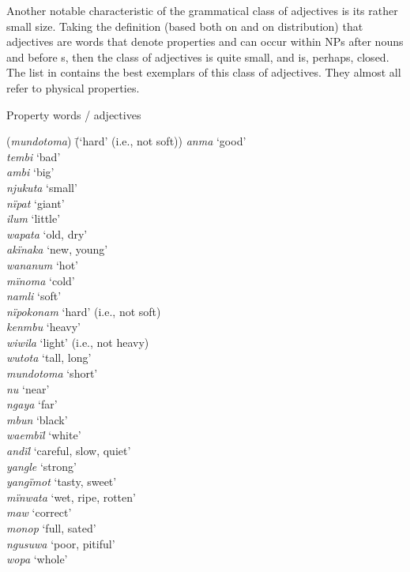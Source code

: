 
Another notable characteristic of the grammatical class of adjectives is its rather small size. Taking the definition (based both on  and on  distribution) that adjectives are words that denote properties and can occur within NPs after nouns and before s, then the class of adjectives is quite small, and is, perhaps, closed. The list in  contains the best exemplars of this class of adjectives. They almost all refer to physical properties.

\ea%
    \label{ex:adj:22}
          Property words / adjectives
\begin{tabbing}
{(\textit{mundotoma}}) \= {(‘hard’ (i.e., not soft))}\kill
\textit{anma}   \>   ‘good’\\
 \textit{tembi}  \>    ‘bad’\\
 \textit{ambi}  \>    ‘big’\\
 \textit{njukuta} \>   ‘small’\\
 \textit{nïpat}  \>    ‘giant’\\
 \textit{ilum}  \>    ‘little’\\
 \textit{wapata}  \>    ‘old, dry’\\
 \textit{akïnaka} \>   ‘new, young’\\
 \textit{wananum} \>   ‘hot’\\
 \textit{mïnoma}  \>  ‘cold’\\
 \textit{namli}  \>    ‘soft’\\
 \textit{nïpokonam} \> ‘hard’ (i.e., not soft)\\
 \textit{kenmbu}   \> ‘heavy’\\
 \textit{wiwila}   \>   ‘light’ (i.e., not heavy)\\
 \textit{wutota}  \>    ‘tall, long’\\
 \textit{mundotoma} \> ‘short’\\
 \textit{nu}   \>     ‘near’\\
 \textit{ngaya}   \>   ‘far’\\
 \textit{mbun}  \> ‘black’\\
 \textit{waembïl}  \>  ‘white’\\
 \textit{andïl} \>      ‘careful, slow, quiet’\\
 \textit{yangle} \>     ‘strong’\\
 \textit{yangïmot}  \>  ‘tasty, sweet’\\
 \textit{mïnwata}  \>  ‘wet, ripe, rotten’\\
 \textit{maw}   \>   ‘correct’\\
 \textit{monop}  \>    ‘full, sated’\\
    \textit{ngusuwa}  \>  ‘poor, pitiful’\\
    \textit{wopa}  \>    ‘whole’
\end{tabbing}
\z

